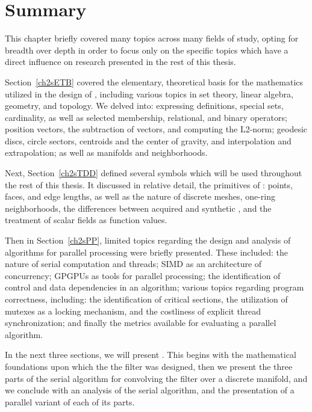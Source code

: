 %
%
%
%
%
%
\section{Summary}
This chapter briefly covered many topics across many fields of study, opting for breadth over depth in order to focus only on the specific topics which have a direct influence on research presented in the rest of this thesis.

Section~\ref{ch2sETB} covered the elementary, theoretical basis for the mathematics utilized in the design of , including various topics in set theory, linear algebra, geometry, and topology. We delved into: expressing definitions, special sets, cardinality, as well as selected membership, relational, and binary operators; position vectors, the subtraction of vectors, and computing the L2-norm; geodesic discs, circle sectors, centroids and the center of gravity, and interpolation and extrapolation; as well as manifolds and neighborhoods.

Next, Section~\ref{ch2sTDD} defined several symbols which will be used throughout the rest of this thesis. It discussed in relative detail, the primitives of \tdd{}: points, faces, and edge lengths, as well as the nature of discrete meshes, one-ring neighborhoods, the differences between acquired and synthetic \tdd{}, and the treatment of scalar fields as function values.

Then in Section~\ref{ch2sPP}, limited topics regarding the design and analysis of algorithms for parallel processing were briefly presented. These included: the nature of serial computation and threads; SIMD as an architecture of concurrency; GPGPUs as tools for parallel processing; the identification of control and data dependencies in an algorithm; various topics regarding program correctness, including: the identification of critical sections, the utilization of mutexes as a locking mechanism, and the costliness of explicit thread synchronization; and finally the metrics available for evaluating a parallel algorithm.

In the next three sections, we will present . This begins with the mathematical foundations upon which the the filter was designed, then we present the three parts of the serial algorithm for convolving the filter over a discrete manifold, and we conclude with an analysis of the serial algorithm, and the presentation of a parallel variant of each of its parts.

